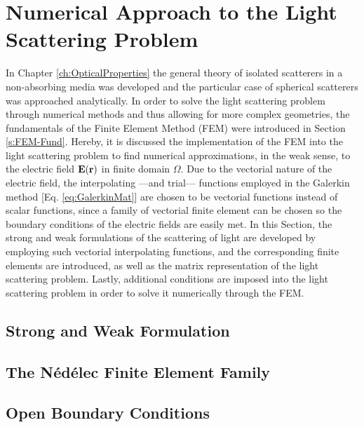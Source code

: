 \documentclass[11pt]{Latex/Classes/PhDthesisPSnPDF}
\begin{document}
    \section{Numerical Approach to the Light Scattering Problem}
     \label{s:Scat-FEM}

    In Chapter \ref{ch:OpticalProperties} the general theory of isolated scatterers in a non-absorbing media was developed and the particular case of spherical scatterers was approached analytically. In order to solve the light scattering problem through numerical methods and thus allowing for more complex geometries, the fundamentals of the Finite Element Method (FEM) were introduced in Section \ref{s:FEM-Fund}. Hereby, it is discussed the implementation of the FEM into the light scattering problem to find numerical approximations, in the weak sense, to the  electric field $\vb{E}(\vb{r})$ in finite domain $\Omega$. Due to the vectorial nature of the electric field, the interpolating ---and trial--- functions employed in the Galerkin method [Eq. \eqref{eq:GalerkinMat}] are chosen to be vectorial functions instead of scalar functions, since a family of vectorial finite element can be chosen so the boundary conditions of the electric fields are easily met. In this Section, the strong and weak formulations of the scattering of light are developed by employing such vectorial interpolating functions, and the corresponding finite elements are introduced, as well as the matrix representation of the light scattering problem. Lastly, additional conditions are imposed into the light scattering problem in order to solve it numerically through the FEM.

        \subsection{Strong and Weak Formulation}
         \label{ss:Scat-Form}
         

         \subsection{The Nédélec Finite Element Family}
          \label{ss:Nedelec}
         

        \subsection{Open Boundary Conditions }
         \label{ss:Sommerfeld-PML}
\end{document}
